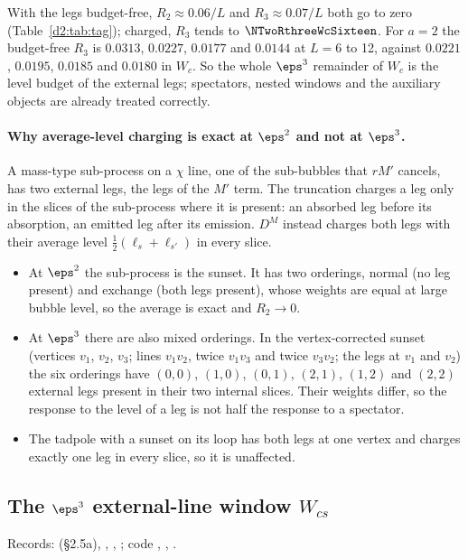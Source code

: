 With the legs budget-free, $R_2\approx0.06/L$ and $R_3\approx0.07/L$ both go to zero (Table~\ref{d2:tab:tag}); charged,
$R_3$ tends to $\NTwoRthreeWcSixteen$. For $a=2$ the budget-free $R_3$ is $0.0313$, $0.0227$, $0.0177$ and $0.0144$ at $L=6$
to 12, against $0.0221$, $0.0195$, $0.0185$ and $0.0180$ in $W_c$. So the whole $\eps^3$ remainder of $W_c$ is the level
budget of the external legs; spectators, nested windows and the auxiliary objects are already treated correctly.

\paragraph{Why average-level charging is exact at $\eps^2$ and not at $\eps^3$.} A mass-type sub-process on a $\chi$ line,
one of the sub-bubbles that $rM'$ cancels, has two external legs, the legs of the $M'$ term. The truncation charges a leg only
in the slices of the sub-process where it is present: an absorbed leg before its absorption, an emitted leg after its
emission. $D^M$ instead charges both legs with their average level $\frac12(\ell_s+\ell_{s'})$ in every slice.
\begin{itemize}
\item At $\eps^2$ the sub-process is the sunset. It has two orderings, normal (no leg present) and exchange (both legs
 present), whose weights are equal at large bubble level, so the average is exact and $R_2\to0$.
\item At $\eps^3$ there are also mixed orderings. In the vertex-corrected sunset (vertices $v_1$, $v_2$, $v_3$; lines $v_1v_2$, twice $v_1v_3$ and twice $v_3v_2$;
 the legs at $v_1$ and $v_2$) the six orderings have $(0,0)$, $(1,0)$, $(0,1)$, $(2,1)$, $(1,2)$ and $(2,2)$ external legs present in
 their two internal slices. Their weights differ, so the response to the level of a leg is not half the response to a
 spectator.
\item The tadpole with a sunset on its loop has both legs at one vertex and charges exactly one leg in every slice, so it is
 unaffected.
\end{itemize}

\subsection{The \texorpdfstring{$\eps^3$}{eps3} external-line window \texorpdfstring{$W_{cs}$}{Wcs}}\label{d2:app:wcs}
{\small\raggedright\noindent Records:  (\S2.5a),
, ,
; code ,
, .\par}

